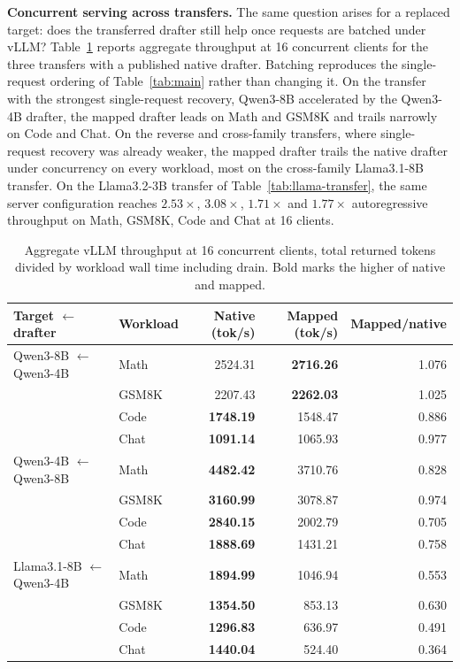 \textbf{Concurrent serving across transfers.} The same question arises for a replaced target: does the transferred drafter still help once requests are batched under vLLM? Table~\ref{tab:transfer-serving} reports aggregate throughput at 16 concurrent clients for the three transfers with a published native drafter. Batching reproduces the single-request ordering of Table~\ref{tab:main} rather than changing it. On the transfer with the strongest single-request recovery, Qwen3-8B accelerated by the Qwen3-4B drafter, the mapped drafter leads on Math and GSM8K and trails narrowly on Code and Chat. On the reverse and cross-family transfers, where single-request recovery was already weaker, the mapped drafter trails the native drafter under concurrency on every workload, most on the cross-family Llama3.1-8B transfer. On the Llama3.2-3B transfer of Table~\ref{tab:llama-transfer}, the same server configuration reaches $2.53\times$, $3.08\times$, $1.71\times$ and $1.77\times$ autoregressive throughput on Math, GSM8K, Code and Chat at 16 clients.

\begin{table}[t]
\centering
\caption{Aggregate vLLM throughput at 16 concurrent clients, total returned tokens divided by workload wall time including drain. Bold marks the higher of native and mapped.}
\label{tab:transfer-serving}
\small
\begin{tabular}{llrrr}
\toprule
Target $\leftarrow$ drafter & Workload & Native (tok/s) & Mapped (tok/s) & Mapped/native \\
\midrule
Qwen3-8B $\leftarrow$ Qwen3-4B & Math & 2524.31 & \textbf{2716.26} & 1.076 \\
 & GSM8K & 2207.43 & \textbf{2262.03} & 1.025 \\
 & Code & \textbf{1748.19} & 1548.47 & 0.886 \\
 & Chat & \textbf{1091.14} & 1065.93 & 0.977 \\
\midrule
Qwen3-4B $\leftarrow$ Qwen3-8B & Math & \textbf{4482.42} & 3710.76 & 0.828 \\
 & GSM8K & \textbf{3160.99} & 3078.87 & 0.974 \\
 & Code & \textbf{2840.15} & 2002.79 & 0.705 \\
 & Chat & \textbf{1888.69} & 1431.21 & 0.758 \\
\midrule
Llama3.1-8B $\leftarrow$ Qwen3-4B & Math & \textbf{1894.99} & 1046.94 & 0.553 \\
 & GSM8K & \textbf{1354.50} & 853.13 & 0.630 \\
 & Code & \textbf{1296.83} & 636.97 & 0.491 \\
 & Chat & \textbf{1440.04} & 524.40 & 0.364 \\
\bottomrule
\end{tabular}
\end{table}

